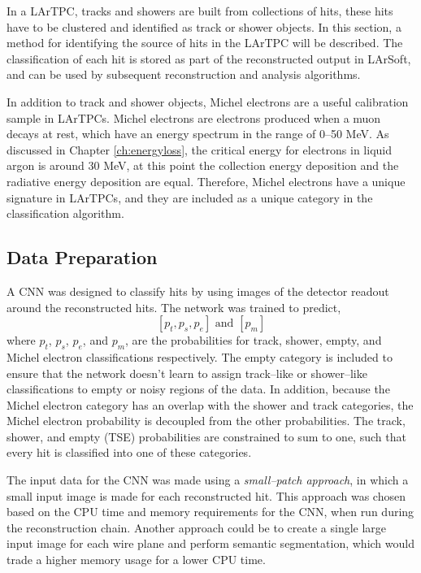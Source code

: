 In a LArTPC, tracks and showers are built from collections of hits, these hits
have to be clustered and identified as track or shower objects. In this section,
a method for identifying the source of hits in the \protodune{} LArTPC will 
be described. The classification of each hit is stored as part of the 
reconstructed output in LArSoft, and can be used by subsequent reconstruction 
and analysis algorithms.

In addition to track and shower objects, Michel electrons are a useful 
calibration sample in LArTPCs. Michel electrons are electrons produced when a 
muon decays at rest, which have an energy spectrum in the range of 0--50 MeV. 
As discussed in Chapter \ref{ch:energyloss}, the critical energy for electrons 
in liquid argon is around 30 MeV, at this point the collection energy deposition 
and the radiative energy deposition are equal. Therefore, Michel electrons 
have a unique signature in LArTPCs, and they are included as a unique category 
in the classification algorithm.

\subsection{Data Preparation}

A CNN was designed to classify hits by using images of the detector readout
around the reconstructed hits. The network was trained to predict,
\begin{equation*}
	\left[ p_t, p_s, p_e \right] \mbox{ and } \left[ p_m \right]
\end{equation*}
where $p_t$, $p_s$, $p_e$, and $p_m$, are the probabilities for track, shower,
empty, and Michel electron classifications respectively. The empty category is
included to ensure that the network doesn't learn to assign track--like or
shower--like classifications to empty or noisy regions of the data. In addition,
because the Michel electron category has an overlap with the shower and track
categories, the Michel electron probability is decoupled from the other 
probabilities. The track, shower, and empty (TSE) probabilities are 
constrained to sum to one, such that every hit is classified into one of these 
categories.

The input data for the CNN was made using a \emph{small--patch approach}, in
which a small input image is made for each reconstructed hit. This approach was
chosen based on the CPU time and memory requirements for the CNN, when run 
during the \protodune{} reconstruction chain. Another approach could be to 
create a single large input image for each wire plane and perform semantic 
segmentation, which would trade a higher memory usage for a lower CPU time.


